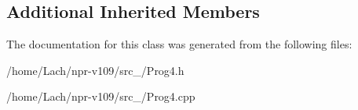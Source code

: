 \subsection*{Additional Inherited Members}


The documentation for this class was generated from the following files\+:\begin{DoxyCompactItemize}
\item 
/home/\+Lach/npr-\/v109/src\+\_/Prog4.\+h\item 
/home/\+Lach/npr-\/v109/src\+\_/Prog4.\+cpp\end{DoxyCompactItemize}
